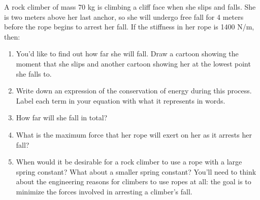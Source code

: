 \documentclass[12pt]{article}
\begin{document}
\Large
\centerline{}
\normalsize
\centerline{}



{A rock climber of mass 70 kg is climbing a cliff face when she slips and falls. She is two meters above her last anchor, so she will undergo free fall for 4 meters before the rope begins to arrest her fall. If the stiffness in her rope is 1400 N/m, then:}
\begin{enumerate}
	\item You'd like to find out how far she will fall. Draw a cartoon showing the moment that she slips and another cartoon showing her at the lowest point she falls to.
	
	\vspace{2in}
	
	\item Write down an expression of the conservation of energy during this process. Label each term in your equation with what it represents in words.
	
	\vspace{1in}
	
	\item{How far will she fall in total?}
	\vspace{2in}
	
	\item{What is the maximum force that her rope will exert on her as it arrests her fall?}
	\vspace{1.5in}
	
	\item When would it be desirable for a rock climber to use a rope with a large spring constant? What about a smaller spring constant? You'll need to think about 
	the engineering reasons for climbers to use ropes at all: the goal is to minimize the forces involved in arresting a climber's fall.
\end{enumerate}

\newpage
%
%
%
\end{document}
